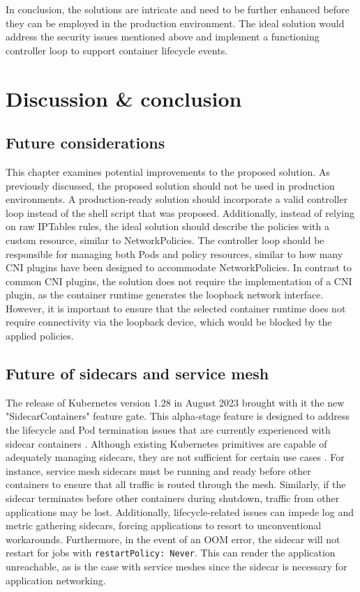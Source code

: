 \documentclass[english, 12pt, a4paper, sci, utf8, a-2b, online]{aaltothesis}
\begin{document}
In conclusion, the solutions are intricate and need to be further enhanced before they can be employed in the production environment.
The ideal solution would address the security issues mentioned above and implement a functioning controller loop to support container lifecycle events.

\clearpage

\section{Discussion \& conclusion} \label{sec:discussion}

\subsection{Future considerations}

This chapter examines potential improvements to the proposed solution.
As previously discussed, the proposed solution should not be used in production environments.
A production-ready solution should incorporate a valid controller loop instead of the shell script that was proposed.
Additionally, instead of relying on raw IPTables rules, the ideal solution should describe the policies with a custom resource, similar to NetworkPolicies.
The controller loop should be responsible for managing both Pods and policy resources, similar to how many CNI plugins have been designed to accommodate NetworkPolicies.
In contrast to common CNI plugins, the solution does not require the implementation of a CNI plugin, as the container runtime generates the loopback network interface.
However, it is important to ensure that the selected container runtime does not require connectivity via the loopback device, which would be blocked by the applied policies.

\subsection{Future of sidecars and service mesh}

The release of Kubernetes version 1.28 in August 2023 brought with it the new "SidecarContainers" feature gate.
This alpha-stage feature is designed to address the lifecycle and Pod termination issues that are currently experienced with sidecar containers \cite{k8s-v1-28-changelog}.
Although existing Kubernetes primitives are capable of adequately managing sidecars, they are not sufficient for certain use cases \cite{k8s-sidecar-kep}.
For instance, service mesh sidecars must be running and ready before other containers to ensure that all traffic is routed through the mesh.
Similarly, if the sidecar terminates before other containers during shutdown, traffic from other applications may be lost.
Additionally, lifecycle-related issues can impede log and metric gathering sidecars, forcing applications to resort to unconventional workarounds.
Furthermore, in the event of an OOM error, the sidecar will not restart for jobs with \lstinline{restartPolicy: Never}.
This can render the application unreachable, as is the case with service meshes since the sidecar is necessary for application networking.
\end{document}
